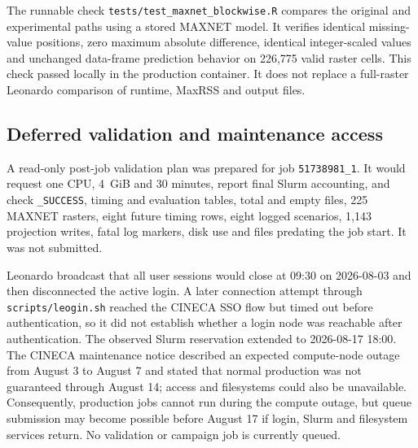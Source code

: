 The runnable check \nolinkurl{tests/test_maxnet_blockwise.R} compares the original and experimental paths using a stored MAXNET model. It verifies identical missing-value positions, zero maximum absolute difference, identical integer-scaled values and unchanged data-frame prediction behavior on 226,775 valid raster cells. This check passed locally in the production container. It does not replace a full-raster Leonardo comparison of runtime, MaxRSS and output files.

\subsection{Deferred validation and maintenance access}

A read-only post-job validation plan was prepared for job \texttt{51738981\_1}. It would request one CPU, 4~GiB and 30 minutes, report final Slurm accounting, and check \texttt{\_SUCCESS}, timing and evaluation tables, total and empty files, 225 MAXNET rasters, eight future timing rows, eight logged scenarios, 1,143 projection writes, fatal log markers, disk use and files predating the job start. It was not submitted.

Leonardo broadcast that all user sessions would close at 09:30 on 2026-08-03 and then disconnected the active login. A later connection attempt through \nolinkurl{scripts/leogin.sh} reached the CINECA SSO flow but timed out before authentication, so it did not establish whether a login node was reachable after authentication. The observed Slurm reservation extended to 2026-08-17 18:00. The CINECA maintenance notice described an expected compute-node outage from August 3 to August 7 and stated that normal production was not guaranteed through August 14; access and filesystems could also be unavailable. Consequently, production jobs cannot run during the compute outage, but queue submission may become possible before August 17 if login, Slurm and filesystem services return. No validation or campaign job is currently queued.
